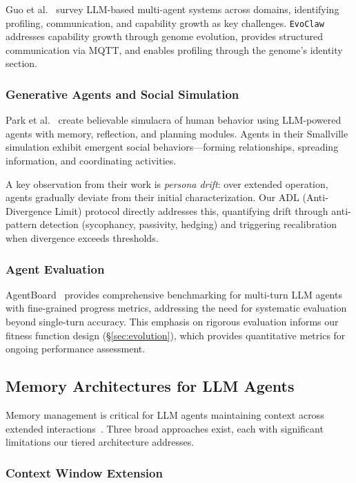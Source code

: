\documentclass{article}
\newcommand{\evoclaw}{\texttt{EvoClaw}\xspace}
\begin{document}
Guo et al.~\cite{guo2024llm_multi_agents} survey LLM-based multi-agent systems across domains, identifying profiling, communication, and capability growth as key challenges. \evoclaw{} addresses capability growth through genome evolution, provides structured communication via MQTT, and enables profiling through the genome's identity section.

\subsubsection{Generative Agents and Social Simulation}

Park et al.~\cite{park2023generative} create believable simulacra of human behavior using LLM-powered agents with memory, reflection, and planning modules. Agents in their Smallville simulation exhibit emergent social behaviors—forming relationships, spreading information, and coordinating activities.

A key observation from their work is \textit{persona drift}: over extended operation, agents gradually deviate from their initial characterization. Our ADL (Anti-Divergence Limit) protocol directly addresses this, quantifying drift through anti-pattern detection (sycophancy, passivity, hedging) and triggering recalibration when divergence exceeds thresholds.

\subsubsection{Agent Evaluation}

AgentBoard~\cite{ma2024agentboard} provides comprehensive benchmarking for multi-turn LLM agents with fine-grained progress metrics, addressing the need for systematic evaluation beyond single-turn accuracy. This emphasis on rigorous evaluation informs our fitness function design (\S\ref{sec:evolution}), which provides quantitative metrics for ongoing performance assessment.

\subsection{Memory Architectures for LLM Agents}

Memory management is critical for LLM agents maintaining context across extended interactions~\cite{zhong2023token}. Three broad approaches exist, each with significant limitations our tiered architecture addresses.

\subsubsection{Context Window Extension}
\end{document}

